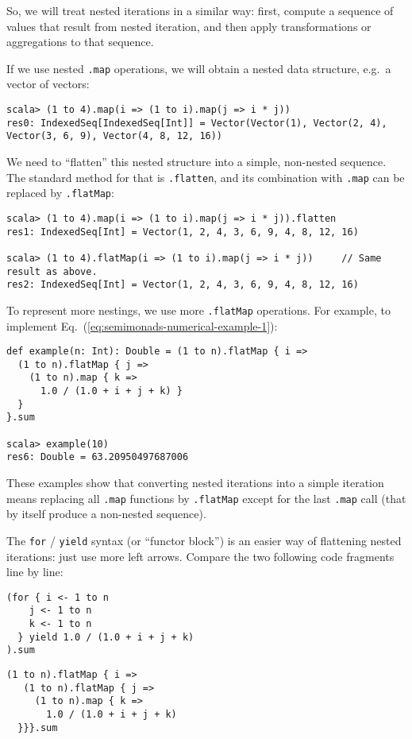 So, we will treat nested iterations in a similar way: first, compute
a sequence of values that result from nested iteration, and then apply
transformations or aggregations to that sequence.

If we use nested \lstinline!.map! operations, we will obtain a nested
data structure, e.g.~a vector of vectors:
\begin{lstlisting}
scala> (1 to 4).map(i => (1 to i).map(j => i * j))
res0: IndexedSeq[IndexedSeq[Int]] = Vector(Vector(1), Vector(2, 4), Vector(3, 6, 9), Vector(4, 8, 12, 16))
\end{lstlisting}
We need to \textsf{``}flatten\textsf{''} this nested structure into a simple, non-nested
sequence. The standard method for that is \lstinline!.flatten!, and
its combination with \lstinline!.map! can be replaced by \lstinline!.flatMap!:
\begin{lstlisting}
scala> (1 to 4).map(i => (1 to i).map(j => i * j)).flatten
res1: IndexedSeq[Int] = Vector(1, 2, 4, 3, 6, 9, 4, 8, 12, 16)

scala> (1 to 4).flatMap(i => (1 to i).map(j => i * j))     // Same result as above.
res2: IndexedSeq[Int] = Vector(1, 2, 4, 3, 6, 9, 4, 8, 12, 16)
\end{lstlisting}
To represent more nestings, we use more \lstinline!.flatMap! operations.
For example, to implement Eq.~(\ref{eq:semimonads-numerical-example-1}):
\begin{lstlisting}
def example(n: Int): Double = (1 to n).flatMap { i =>
  (1 to n).flatMap { j =>
    (1 to n).map { k => 
      1.0 / (1.0 + i + j + k) }
  }
}.sum

scala> example(10)
res6: Double = 63.20950497687006
\end{lstlisting}
These examples show that converting nested iterations into a simple
iteration means replacing all \lstinline!.map! functions by \lstinline!.flatMap!
except for the last \lstinline!.map! call (that by itself produce
a non-nested sequence).

The \lstinline!for! / \lstinline!yield! syntax (or \textsf{``}functor block\textsf{''})
is an easier way of flattening nested iterations: just use more left
arrows. Compare the two following code fragments line by line:

\noindent \texttt{\textcolor{blue}{\footnotesize{}}}%
\begin{minipage}[c]{0.475\columnwidth}%
\texttt{\textcolor{blue}{\footnotesize{}}}
\begin{lstlisting}
(for { i <- 1 to n
    j <- 1 to n
    k <- 1 to n
  } yield 1.0 / (1.0 + i + j + k)
).sum
\end{lstlisting}
%
\end{minipage}\texttt{\textcolor{blue}{\footnotesize{}\hspace*{\fill}}}%
\begin{minipage}[c]{0.475\columnwidth}%
\texttt{\textcolor{blue}{\footnotesize{}}}
\begin{lstlisting}
(1 to n).flatMap { i =>
   (1 to n).flatMap { j =>
     (1 to n).map { k =>
       1.0 / (1.0 + i + j + k)
  }}}.sum
\end{lstlisting}
%
\end{minipage}{\footnotesize\par}


